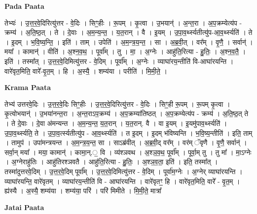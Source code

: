 \documentclass[17pt]{extarticle}
\begin{document}
\textbf{Pada Paata} \newline

तेभ्यः॑ । उ॒त्त॒र॒वे॒दिरित्यु॑त्तर - वे॒दिः । सिꣳ॒॒हीः । रू॒पम् । कृ॒त्वा । उ॒भयान्॑ । अ॒न्त॒रा । अ॒प॒क्रम्येत्य॑प - क्रम्य॑ । अ॒ति॒ष्ठ॒त् । ते । दे॒वाः । अ॒म॒न्य॒न्त॒ । य॒त॒रान् । वै । इ॒यम् । उ॒पा॒व॒र्थ्स्यतीत्यु॑प-आ॒व॒र्थ्स्यति॑ । ते । इ॒दम् । भ॒वि॒ष्य॒न्ति॒ । इति॑ । ताम् । उपेति॑ । अ॒म॒न्त्र॒य॒न्त॒ । सा । अ॒ब्र॒वी॒त् । वर᳚म् । वृ॒णै॒ । सर्वान्॑ । मया᳚ । कामान्॑ । वीति॑ । अ॒श्न॒व॒थ॒ । पूर्वा᳚म् । तु । मा॒ । अ॒ग्नेः । आहु॑ति॒रित्या - हु॒तिः॒ । अ॒श्न॒व॒तै॒ । इति॑ । तस्मा᳚त् । उ॒त्त॒र॒वे॒दिमित्यु॑त्तर - वे॒दिम् । पूर्वा᳚म् । अ॒ग्नेः । व्याघा॑रय॒न्तीति॑ वि-आघा॑रयन्ति । वारे॑वृत॒मिति॒ वारे᳚-वृ॒त॒म् । हि । अ॒स्यै॒ । शम्य॑या । परीति॑ । मि॒मी॒ते॒ ।  \newline


\textbf{Krama Paata} \newline

तेभ्य॑ उत्तरवे॒दिः । उ॒त्त॒र॒वे॒दिः सिꣳ॒॒हीः । उ॒त्त॒र॒वे॒दिरित्यु॑त्तर - वे॒दिः । सिꣳ॒॒ही रू॒पम् । रू॒पम् कृ॒त्वा । कृ॒त्वोभयान्॑ । उ॒भया॑नन्त॒रा । अ॒न्त॒राऽप॒क्रम्य॑ । अ॒प॒क्रम्या॑तिष्ठत् । अ॒प॒क्रम्येत्य॑प - क्रम्य॑ । अ॒ति॒ष्ठ॒त् ते । ते दे॒वाः । दे॒वा अ॑मन्यन्त । अ॒म॒न्य॒न्त॒ य॒त॒रान् । य॒त॒रान्. वै । वा इ॒यम् । इ॒यमु॑पाव॒र्थ्स्यति॑ । उ॒पा॒व॒र्थ्स्यति॒ ते । उ॒पा॒व॒र्त्स्यतीत्यु॑प - आ॒व॒र्थ्स्यति॑ । त इ॒दम् । इ॒दम् भ॑विष्यन्ति । भ॒वि॒ष्य॒न्तीति॑ । इति॒ ताम् । तामुप॑ । उपा॑मन्त्रयन्त । अ॒म॒न्त्र॒य॒न्त॒ सा । साऽब्र॑वीत् । अ॒ब्र॒वी॒द् वर᳚म् । वर॑म् ॅवृणै । वृ॒णै॒ सर्वान्॑ । सर्वा॒न् मया᳚ । मया॒ कामान्॑ । कामा॒न्.॒ वि । व्य॑श्ञवथ । अ॒श्ञ॒व॒थ॒ पूर्वा᳚म् । पूर्वा॒म् तु । तु मा᳚ । मा॒ऽग्नेः । अ॒ग्नेराहु॑तिः । आहु॑तिरश्ञवतै । आहु॑ति॒रित्या - हु॒तिः॒ । अ॒श्ञ॒व॒ता॒ इति॑ । इति॒ तस्मा᳚त् । तस्मा॑दुत्तरवे॒दिम् । उ॒त्त॒र॒वे॒दिम् पूर्वा᳚म् । उ॒त्त॒र॒वे॒दिमित्यु॑त्तर - वे॒दिम् । पूर्वा॑म॒ग्नेः । अ॒ग्नेर् व्याघा॑रयन्ति । व्याघा॑रयन्ति॒ वारे॑वृतम् । व्याघा॑रय॒न्तीति॑ वि - आघा॑रयन्ति । वारे॑वृतꣳ॒॒ हि । वारे॑वृत॒मिति॒ वारे᳚ - वृ॒त॒म् । ह्य॑स्यै । अ॒स्यै॒ शम्य॑या । शम्य॑या॒ परि॑ । परि॑ मिमीते । मि॒मी॒ते॒ मात्रा᳚ \newline

\textbf{Jatai Paata} \newline
\end{document}
